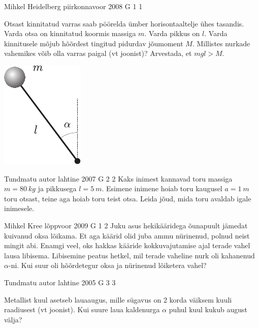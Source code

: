 \documentclass[11pt, twoside]{article}
\begin{document}
{%
{Mihkel Heidelberg} %
{piirkonnavoor} %
{2008} %
{G 1} %
{1} %
{
\ifStatement
Otsast kinnitatud varras saab pöörelda ümber horisontaaltelje ühes tasandis. Varda otsa on kinnitatud koormis massiga $m$. Varda pikkus on $l$. Varda kinnitusele mõjub hõõrdest tingitud pidurdav jõumoment $M$. Millistes nurkade vahemikes võib olla varras paigal (vt joonist)? Arvestada, et $mgl > M$.
\begin{center}
	\includegraphics[width=0.3\linewidth]{2008-v2g-01-yl}
\end{center}
\fi
}

{Tundmatu autor} %
{lahtine} %
{2007} %
{G 2} %
{2} %
{
\ifStatement
Kaks inimest kannavad toru massiga $m = \SI{80}{kg}$ ja pikkusega $l = \SI{5}{m}$. Esimene inimene hoiab toru kaugusel $a = \SI{1}{m}$ toru otsast, teine aga hoiab toru teist otsa. Leida jõud, mida toru avaldab igale inimesele.
\fi
}

{Mihkel Kree} %
{lõppvoor} %
{2009} %
{G 1} %
{2} %
{
\ifStatement
Juku asus hekikääridega õunapuult jämedat kuivanud oksa lõikama. Et aga käärid olid juba ammu nürinenud, polnud neist mingit abi. Enamgi veel, oks hakkas kääride kokkuvajutamise ajal terade vahel lausa libisema. Libisemine peatus hetkel, mil terade vaheline nurk oli kahanenud $\alpha$-ni. Kui suur oli hõõrdetegur oksa ja nürinenud lõiketera vahel?
\fi
}

{Tundmatu autor} %
{lahtine} %
{2005} %
{G 3} %
{3} %
{
\ifStatement
Metallist kuul asetseb lauaaugus, mille sügavus on 2 korda väiksem kuuli raadiusest (vt joonist). Kui suure laua kaldenurga $\alpha$ puhul kuul kukub august välja? 

}}
\end{document}
